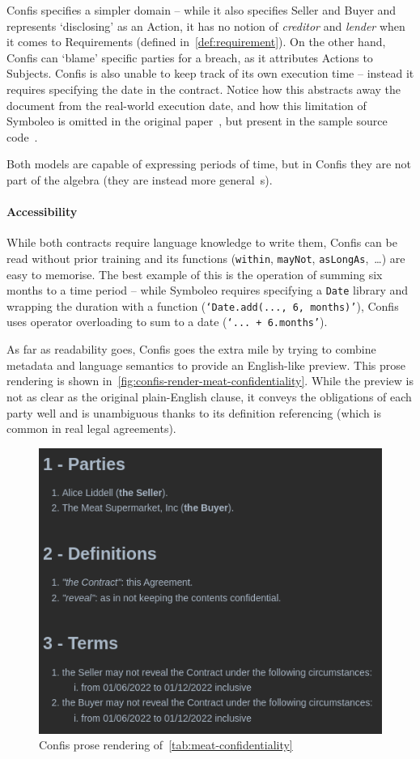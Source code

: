 Confis specifies a simpler domain -- while it also specifies Seller and Buyer and represents `disclosing' as an Action, it has no notion of \emph{creditor} and \emph{lender} when it comes to Requirements (defined in~\autoref{def:requirement}).
On the other hand, Confis can `blame' specific parties for a breach, as it attributes Actions to Subjects.
Confis is also unable to keep track of its own execution time -- instead it requires specifying the date in the contract.
Notice how this abstracts away the document from the real-world execution date, and how this limitation of Symboleo is omitted in the original paper~\cite{symboleo2020}, but present in the sample source code~\cite{symboleoMeat}.

Both models are capable of expressing periods of time, but in Confis they are not part of the algebra (they are instead more general~s).

\paragraph{Accessibility}

While both contracts require language knowledge to write them, Confis can be read without prior training and its functions (\texttt{within}, \texttt{mayNot}, \texttt{asLongAs},~\dots) are easy to memorise.
The best example of this is the operation of summing six months to a time period -- while Symboleo requires specifying a \texttt{Date} library and wrapping the duration with a function (\texttt{`Date.add(..., 6, months)'}), Confis uses operator overloading to sum to a date (\texttt{`... + 6.months'}).

As far as readability goes, Confis goes the extra mile by trying to combine metadata and language semantics to provide an English-like preview.
This prose rendering is shown in~\autoref{fig:confis-render-meat-confidentiality}.
While the preview is not as clear as the original plain-English clause, it conveys the obligations of each party well and is unambiguous thanks to its definition referencing (which is common in real legal agreements).

\begin{figure}[H]
    \centering
    \includegraphics[width=0.67\columnwidth]{figures/confis.meat.prose}
    \caption{Confis prose rendering of~\autoref{tab:meat-confidentiality}}
    \label{fig:confis-render-meat-confidentiality}
\end{figure}

